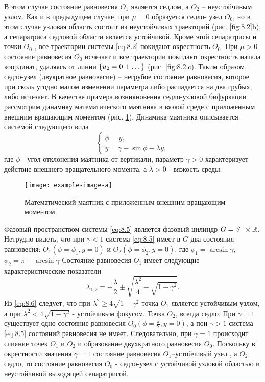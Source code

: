 В этом случае состояние равновесия $O_1$ является седлом, а $O_2$ --
неустойчивым узлом. Как и в предыдущем случае, при $\mu=0$ образуется седло-
узел $O_0$, но в этом случае узловая область состоит из неустойчивых траекторий
(рис. \ref{fig:8.2}b), а сепаратриса седловой области является устойчивой. Кроме этой
сепаратрисы и точки $O_0$ , все траектории системы \eqref{eq:8.2} покидают окрестность
$O_0$. При $\mu>0$ состояние равновесия $O_0$ исчезает и все траектории покидают
окрестность начала координат, удаляясь от линии $\qty{u_2=0+\dots}$ (рис. \ref{fig:8.2}c).
Таким образом, седло-узел (двукратное равновесие) -- негрубое состояние
равновесия, которое при сколь угодно малом изменении параметра либо
распадается на два грубых, либо исчезает.
В качестве примера возникновения седло-узловой бифуркации
рассмотрим динамику математического маятника в вязкой среде с
приложенным внешним вращающим моментом (рис. \ref{fig:8.3}). Динамика маятника
описывается системой следующего вида
\begin{equation}
        \label{eq:8.5}
        \begin{cases}
                \dot \phi =y,\\
               \dot y = \gamma - \sin \phi - \lambda y, 
        \end{cases}
\end{equation}
где $\phi$ - угол отклонения маятника от вертикали, параметр $\gamma>0$ 
характеризует действие внешнего вращательного момента, а $\lambda>0$
- вязкость среды.
 \begin{figure}[h]
        \centering
        \texttt{[image: example-image-a]}
        \caption{Математический маятник с приложенным внешним вращающим моментом.}
        \label{fig:8.3}
\end{figure}
Фазовый пространством системы \eqref{eq:8.5} является фазовый цилиндр $G= S^1 \times \mathbb{R}$.
Нетрудно видеть, что при $\gamma<1$ система \eqref{eq:8.5} имеет в $G$ два состояния равновесия:
$O_1(\phi=\phi_1, y=0)$ и $O_2(\phi=\phi_2, y=0)$, где $\phi_1= \arcsin \gamma$,
$\phi_2 = \pi - \arcsin \gamma$
Состояние равновесия $O_1$ имеет следующие характеристические показатели
\begin{equation}
        \label{eq:8.6}
        \lambda_{1,2} = - \frac{\lambda}{2} \pm \sqrt{ \frac{\lambda^2}{4} - \sqrt{1-\gamma^2} }.
\end{equation}
Из \eqref{eq:8.6} следует, что при $\lambda^2 \geq 4 \sqrt{1-\gamma^2}$ точка $O_1$ является устойчивым узлом, а при 
$\lambda^2 < 4 \sqrt{1-\gamma^2}$ - устойчивым фокусом. Точка $O_2$, всегда седло.
При $\gamma=1$ существует одно состояние равновесия $O_0(\phi= \frac{\pi}{2}, y=0)$, а пои $\gamma>1$ система \eqref{eq:8.5} состояний равновесия не имеет. Следовательно, при $\gamma=1$ 
происходит слияние точек $O_1$ и $O_2$ и образование двухкратного равновесия $O_0$.
Поскольку в окрестности значения $\gamma=1$ состояние равновесия $O_1$--устойчивый узел
, а $O_2$ седло, то состояние равновесия $O_0$ - седло-узел с устойчивой узловой областью 
и неустойчивой выходящей сепаратрисой.

